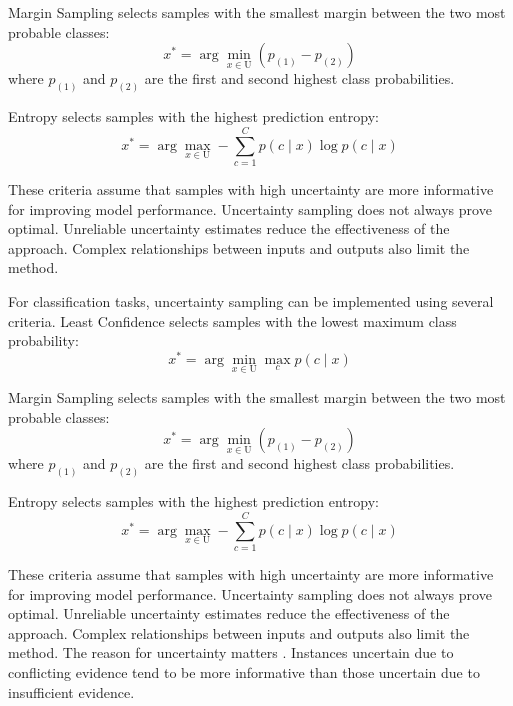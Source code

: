 \documentclass[conference]{IEEEtran}
\newcommand{\set}[1]{\mathrm{#1}}  %
\begin{document}
Margin Sampling selects samples with the smallest margin between the two most probable classes:
\begin{equation}
x^* = \arg\min_{x \in \set{U}} (p_{(1)} - p_{(2)})
\end{equation}
where $p_{(1)}$ and $p_{(2)}$ are the first and second highest class probabilities.

Entropy selects samples with the highest prediction entropy:
\begin{equation}
x^* = \arg\max_{x \in \set{U}} -\sum_{c=1}^C p(c \mid x) \log p(c \mid x)
\end{equation}

These criteria assume that samples with high uncertainty are more informative for improving model performance. Uncertainty sampling does not always prove optimal. Unreliable uncertainty estimates reduce the effectiveness of the approach. Complex relationships between inputs and outputs also limit the method.

For classification tasks, uncertainty sampling can be implemented using several criteria. Least Confidence selects samples with the lowest maximum class probability:
\begin{equation}
x^* = \arg\min_{x \in \set{U}} \max_c p(c \mid x)
\end{equation}

Margin Sampling selects samples with the smallest margin between the two most probable classes:
\begin{equation}
x^* = \arg\min_{x \in \set{U}} (p_{(1)} - p_{(2)})
\end{equation}
where $p_{(1)}$ and $p_{(2)}$ are the first and second highest class probabilities.

Entropy selects samples with the highest prediction entropy:
\begin{equation}
x^* = \arg\max_{x \in \set{U}} -\sum_{c=1}^C p(c \mid x) \log p(c \mid x)
\end{equation}

These criteria assume that samples with high uncertainty are more informative for improving model performance. Uncertainty sampling does not always prove optimal. Unreliable uncertainty estimates reduce the effectiveness of the approach. Complex relationships between inputs and outputs also limit the method. The reason for uncertainty matters \cite{sharma2016evidence}. Instances uncertain due to conflicting evidence tend to be more informative than those uncertain due to insufficient evidence.
\end{document}
